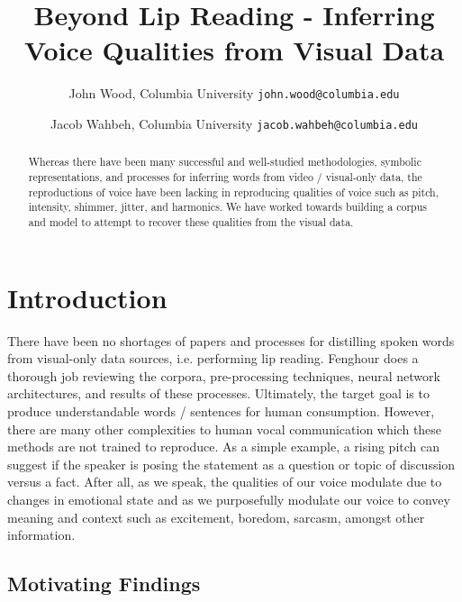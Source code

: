 \documentclass[10pt,twocolumn,letterpaper]{article}
\begin{document}
\title{Beyond Lip Reading - Inferring Voice Qualities from Visual Data}

\author{John Wood, 
Columbia University
{\tt\small john.wood@columbia.edu}
\and Jacob Wahbeh,
Columbia University
{\tt\small jacob.wahbeh@columbia.edu}
}
\maketitle

\begin{abstract}
   Whereas there have been many successful and well-studied methodologies, symbolic representations, and processes for inferring words from video / visual-only data, the reproductions of voice have been lacking in reproducing qualities of voice such as pitch, intensity, shimmer, jitter, and harmonics. We have worked towards building a corpus and model to attempt to recover these qualities from the visual data.
\end{abstract}

\section{Introduction}
\label{sec:intro}

There have been no shortages of papers and processes for distilling spoken words from visual-only data sources, i.e. performing lip reading. Fenghour  \cite{Fenghour2021} does a thorough job reviewing the corpora, pre-processing techniques, neural network architectures, and results of these processes. Ultimately, the target goal is to produce understandable words / sentences for human consumption. However, there are many other complexities to human vocal communication which these methods are not trained to reproduce. As a simple example, a rising pitch can suggest if the speaker is posing the statement as a question or topic of discussion versus a fact. After all, as we speak, the qualities of our voice modulate due to changes in emotional state and as we purposefully modulate our voice to convey meaning and context such as excitement, boredom, sarcasm, amongst other information. 

\subsection{Motivating Findings}
\end{document}
